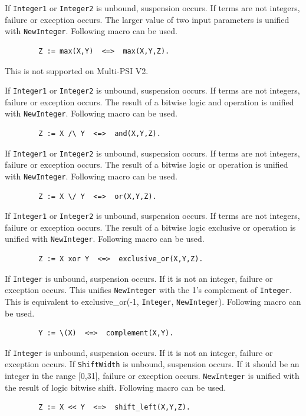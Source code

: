 \begin{itemize}
If \verb|Integer1| or \verb|Integer2| is unbound, suspension occurs.
If terms are not integers, failure or exception occurs.
The larger value of two input parameters is unified with \verb|NewInteger|.
Following macro can be used.
\begin{verbatim}
        Z := max(X,Y)  <=>  max(X,Y,Z).
\end{verbatim}
\Caution This is not supported on Multi-PSI V2.

If \verb|Integer1| or \verb|Integer2| is unbound, suspension occurs.
If terms are not integers, failure or exception occurs.
The result of a bitwise logic and operation is unified with \verb|NewInteger|.
Following macro can be used.
\begin{verbatim}
        Z := X /\ Y  <=>  and(X,Y,Z).
\end{verbatim}

\index{\verb|/\|}
If \verb|Integer1| or \verb|Integer2| is unbound, suspension occurs.
If terms are not integers, failure or exception occurs.
The result of a bitwise logic or operation is unified with \verb|NewInteger|.
Following macro can be used.
\begin{verbatim}
        Z := X \/ Y  <=>  or(X,Y,Z).
\end{verbatim}

\index{\verb|\/|}
If \verb|Integer1| or \verb|Integer2| is unbound, suspension occurs.
If terms are not integers, failure or exception occurs.
The result of a bitwise logic exclusive or operation is unified with 
\verb|NewInteger|. Following macro can be used.
\begin{verbatim}
        Z := X xor Y  <=>  exclusive_or(X,Y,Z).
\end{verbatim}

If \verb|Integer| is unbound, suspension occurs.
If it is not an integer, failure or exception occurs.
This unifies \verb|NewInteger| with the 1's complement of \verb|Integer|.
This is equivalent to exclusive_or(-1, \verb|Integer|, \verb|NewInteger|).
Following macro can be used.
\begin{verbatim}
        Y := \(X)  <=>  complement(X,Y).
\end{verbatim}

\index{\verb|\|}
If \verb|Integer| is unbound, suspension occurs.
If it is not an integer, failure or exception occurs.
If \verb|ShiftWidth| is unbound, suspension occurs.
If it should be an integer in the range [0,31], failure or exception occurs.
\verb|NewInteger| is unified with the result of logic bitwise shift.
Following macro can be used.
\begin{verbatim}
        Z := X << Y  <=>  shift_left(X,Y,Z).
\end{verbatim}


\end{itemize}
